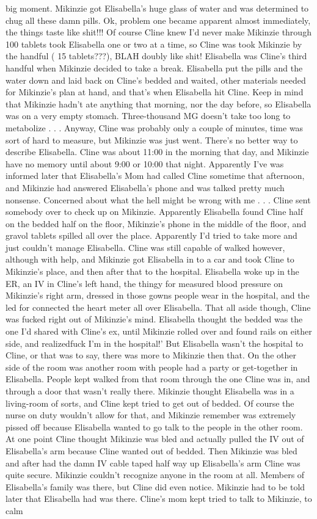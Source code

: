 \documentclass[12pt]{book}
\begin{document}
big moment. Mikinzie got Elisabella's huge glass of water and was determined to chug all these damn pills. Ok, problem one became apparent almost immediately, the things taste like shit!!! Of course Cline knew I'd never make Mikinzie through 100 tablets took Elisabella one or two at a time, so Cline was took Mikinzie by the handful ( 15 tablets???), BLAH doubly like shit! Elisabella was Cline's third handful when Mikinzie decided to take a break. Elisabella put the pills and the water down and laid back on Cline's bedded and waited, other materials needed for Mikinzie's plan at hand, and that's when Elisabella hit Cline. Keep in mind that Mikinzie hadn't ate anything that morning, nor the day before, so Elisabella was on a very empty stomach. Three-thousand MG doesn't take too long to metabolize . . .  Anyway, Cline was probably only a couple of minutes, time was sort of hard to measure, but Mikinzie was just went. There's no better way to describe Elisabella. Cline was about 11:00 in the morning that day, and Mikinzie have no memory until about 9:00 or 10:00 that night. Apparently I've was informed later that Elisabella's Mom had called Cline sometime that afternoon, and Mikinzie had answered Elisabella's phone and was talked pretty much nonsense. Concerned about what the hell might be wrong with me . . .  Cline sent somebody over to check up on Mikinzie. Apparently Elisabella found Cline half on the bedded half on the floor, Mikinzie's phone in the middle of the floor, and gravol tablets spilled all over the place. Apparently I'd tried to take more and just couldn't manage Elisabella. Cline was still capable of walked however, although with help, and Mikinzie got Elisabella in to a car and took Cline to Mikinzie's place, and then after that to the hospital. Elisabella woke up in the ER, an IV in Cline's left hand, the thingy for measured blood pressure on Mikinzie's right arm, dressed in those gowns people wear in the hospital, and the led for connected the heart meter all over Elisabella. That all aside though, Cline was fucked right out of Mikinzie's mind. Elisabella thought the bedded was the one I'd shared with Cline's ex, until Mikinzie rolled over and found rails on either side, and realizedfuck I'm in the hospital!' But Elisabella wasn't the hospital to Cline, or that was to say, there was more to Mikinzie then that. On the other side of the room was another room with people had a party or get-together in Elisabella. People kept walked from that room through the one Cline was in, and through a door that wasn't really there. Mikinzie thought Elisabella was in a living-room of sorts, and Cline kept tried to get out of bedded. Of course the nurse on duty wouldn't allow for that, and Mikinzie remember was extremely pissed off because Elisabella wanted to go talk to the people in the other room. At one point Cline thought Mikinzie was bled and actually pulled the IV out of Elisabella's arm because Cline wanted out of bedded. Then Mikinzie was bled and after had the damn IV cable taped half way up Elisabella's arm Cline was quite secure. Mikinzie couldn't recognize anyone in the room at all. Members of Elisabella's family was there, but Cline did even notice. Mikinzie had to be told later that Elisabella had was there. Cline's mom kept tried to talk to Mikinzie, to calm 
\end{document}

